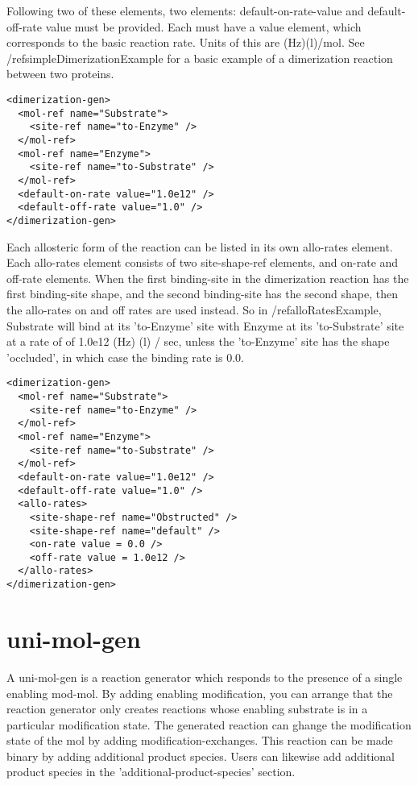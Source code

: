 Following two of these elements, two elements: default-on-rate-value
and default-off-rate value must be provided.  Each must have a value
element, which corresponds to the basic reaction rate.  Units of this
are (Hz)(l)/mol.  See /ref{simpleDimerizationExample} for a basic
example of a dimerization reaction between two proteins.

\begin{lstlisting}
<dimerization-gen>
  <mol-ref name="Substrate">
    <site-ref name="to-Enzyme" />
  </mol-ref>
  <mol-ref name="Enzyme">
    <site-ref name="to-Substrate" />
  </mol-ref>
  <default-on-rate value="1.0e12" />
  <default-off-rate value="1.0" />
</dimerization-gen>
\end{lstlisting}

Each allosteric form of the reaction can be listed in its own
allo-rates element.  Each allo-rates element consists of two
site-shape-ref elements, and on-rate and off-rate elements.  When the
first binding-site in the dimerization reaction has the first
binding-site shape, and the second binding-site has the second shape,
then the allo-rates on and off rates are used instead.  So in
/ref{alloRatesExample}, Substrate will bind at its 'to-Enzyme' site
with Enzyme at its 'to-Substrate' site at a rate of of 1.0e12 (Hz) (l)
/ sec, unless the 'to-Enzyme' site has the shape 'occluded', in which
case the binding rate is 0.0.

\begin{lstlisting} 
<dimerization-gen>
  <mol-ref name="Substrate">
    <site-ref name="to-Enzyme" />
  </mol-ref>
  <mol-ref name="Enzyme">
    <site-ref name="to-Substrate" />
  </mol-ref>
  <default-on-rate value="1.0e12" />
  <default-off-rate value="1.0" />
  <allo-rates>
    <site-shape-ref name="Obstructed" />
    <site-shape-ref name="default" />
    <on-rate value = 0.0 />
    <off-rate value = 1.0e12 />
  </allo-rates>
</dimerization-gen>
 \end{lstlisting}


\section{uni-mol-gen}
A uni-mol-gen is a reaction generator which responds to the presence
of a single enabling mod-mol.  By adding enabling modification, you
can arrange that the reaction generator only creates reactions whose
enabling substrate is in a particular modification state.  The
generated reaction can ghange the modification state of the mol by
adding modification-exchanges.  This reaction can be made
binary by adding additional product species.  Users can likewise add
additional product species in the 'additional-product-species'
section.  

